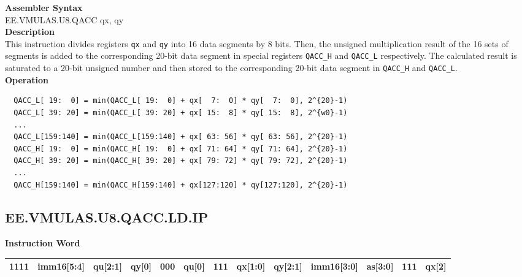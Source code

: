 \textbf{Assembler Syntax} \\
EE.VMULAS.U8.QACC qx, qy \\
\textbf{Description} \\
This instruction divides registers \lstinline{qx} and \lstinline{qy} into 16 data segments by 8 bits. Then, the unsigned multiplication result of the 16 sets of segments is added to the corresponding 20-bit data segment in special registers \lstinline{QACC_H} and \lstinline{QACC_L} respectively. The calculated result is saturated to a 20-bit unsigned number and then stored to the corresponding 20-bit data segment in \lstinline{QACC_H} and \lstinline{QACC_L}.\\
\textbf{Operation}
\begin{lstlisting}
  QACC_L[ 19:  0] = min(QACC_L[ 19:  0] + qx[  7:  0] * qy[  7:  0], 2^{20}-1)
  QACC_L[ 39: 20] = min(QACC_L[ 39: 20] + qx[ 15:  8] * qy[ 15:  8], 2^{w0}-1)
  ...
  QACC_L[159:140] = min(QACC_L[159:140] + qx[ 63: 56] * qy[ 63: 56], 2^{20}-1)
  QACC_H[ 19:  0] = min(QACC_H[ 19:  0] + qx[ 71: 64] * qy[ 71: 64], 2^{20}-1)
  QACC_H[ 39: 20] = min(QACC_H[ 39: 20] + qx[ 79: 72] * qy[ 79: 72], 2^{20}-1)
  ...
  QACC_H[159:140] = min(QACC_H[159:140] + qx[127:120] * qy[127:120], 2^{20}-1)
\end{lstlisting}

\clearpage
\subsection{EE.VMULAS.U8.QACC.LD.IP}\label{instruction:EEVMULASU8QACCLDIP}
\setlength\tabcolsep{6pt}
\textbf{Instruction Word} \\
\begin{tabular}{|c|c|c|c|c|c|c|c|c|c|c|c|c|}
	\hline
	1111 & imm16[5:4] & qu[2:1] & qy[0] & 000 & qu[0] & 111 & qx[1:0] & qy[2:1] & imm16[3:0] & as[3:0] & 111 & qx[2] \\
	\hline
\end{tabular}

